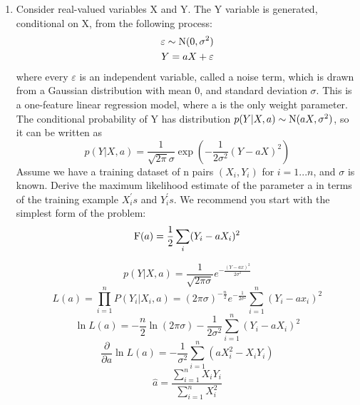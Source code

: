 \documentclass[a4paper]{article}
\begin{document}
\begin{enumerate}
		\item
		Consider real-valued variables X and Y. The Y variable is generated, conditional on X, from the following process:
		\begin{equation*}
		\begin{split}
			\varepsilon \sim {\rm N}(0,\sigma^2) \\
			Y = aX+\varepsilon
		\end{split}
		\end{equation*}
		where every $\varepsilon$ is an independent variable, called a noise term, which is drawn from a Gaussian distribution with mean 0, and standard deviation $\sigma$. This is a one-feature linear regression model, where a is the only weight parameter. The conditional probability of Y has distribution $p(Y|X,a)\sim{\rm N}(aX,\sigma^2)$, so it can be written as 
		\begin{equation*}
			p(Y|X,a)=\frac{1}{\sqrt{2\pi}\sigma}\exp(-\frac{1}{2\sigma^2}(Y-aX)^2)
		\end{equation*} 
		Assume we have a training dataset of n pairs $(X_i,Y_i)$ for $i=1...n$, and $\sigma$ is known. Derive the maximum likelihood estimate of the parameter a in terms of the training example $X_i^{'}s$ and $Y_i^{'}s$. We recommend you start with the simplest form of the problem:
		\begin{equation*}
			{\rm F}(a)=\frac{1}{2}\sum_{i}(Y_i - aX_i)^2
		\end{equation*} 
		\begin{solution}
			\begin{equation*}
				p(Y|X,a) = \frac{1}{\sqrt{2\pi \sigma}}e^{-\frac{(Y-ax)^2}{2\sigma^2}}
			\end{equation*}
			\begin{equation*}
				L(a) = \prod_{i = 1}^{n}P(Y_i|X_i,a) = (2\pi\sigma)^{-\frac{n}{2}}e^{-\frac{1}{2\sigma^2}}\sum_{i = 1}^{n}(Y_i - ax_i)^2
			\end{equation*}
			\begin{equation*}
				\ln L(a) = -\frac{n}{2}\ln (2\pi \sigma) - \frac{1}{2 \sigma^2}\sum_{i = 1}^{n}(Y_i - a X_i)^2
			\end{equation*}
			\begin{equation*}
				\frac{\partial}{\partial a}\ln L(a) = -\frac{1}{\sigma^2}\sum_{i = 1}^{n}(aX_i^2 - X_iY_i)
			\end{equation*}
			\begin{equation*}
				\hat{a} = \frac{\sum_{i = 1}^{n}X_iY_i}{\sum_{i = 1}^{n}X_i^2}
			\end{equation*}

\end{solution}
\end{enumerate}
\end{document}
